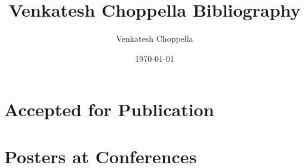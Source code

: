 \documentclass[11pt]{article}
\author{Venkatesh Choppella}
\date{\today}
\title{Venkatesh Choppella Bibliography}
\begin{document}
\maketitle
\tableofcontents




\section{Accepted for Publication}
\begin{refsection}[accepted]
\nocite{*}
\printbibliography[keyword={accepted}, title={}
]
\end{refsection}


\section{Posters at Conferences}
\begin{refsection}[posters]
\nocite{*}
\printbibliography[keyword={poster}, title={}
]
\end{refsection}
\end{document}
